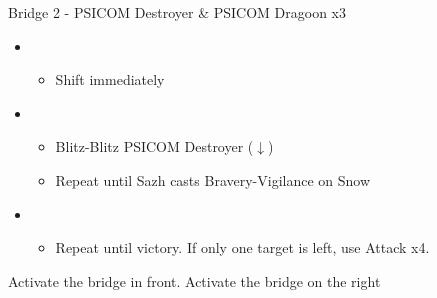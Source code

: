 \begin{battle}{Bridge 2 - PSICOM Destroyer \& PSICOM Dragoon x3}
\begin{itemize}
    \item \first
    \begin{itemize}
        \item Shift immediately
    \end{itemize}
    \item \third
    \begin{itemize}
        \item Blitz-Blitz PSICOM Destroyer ($\downarrow$)
        \item Repeat until Sazh casts Bravery-Vigilance on Snow
    \end{itemize}
    \item \fifth
    \begin{itemize}
        \item Repeat until victory. If only one target is left, use Attack x4.
    \end{itemize}
\end{itemize}
  
\end{battle}
Activate the bridge in front.  Activate the bridge on the right

